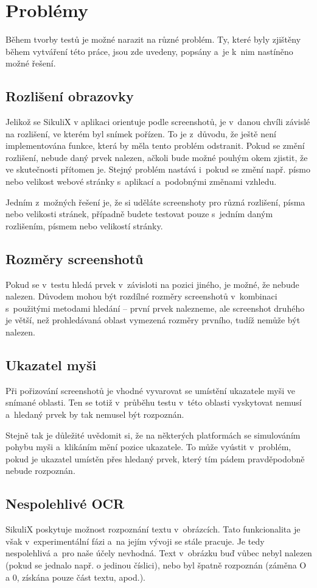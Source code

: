 \chapter{Problémy}
Během tvorby testů je možné narazit na různé problém. Ty, které byly zjištěny během vytváření této práce, jsou zde uvedeny, popsány a~je k~nim nastíněno možné řešení.

	\section{Rozlišení obrazovky}
	Jelikož se SikuliX v aplikaci orientuje podle screenshotů, je v~danou chvíli závislé na rozlišení, ve kterém byl snímek pořízen. To je z~důvodu, že ještě není implementována funkce, která by měla tento problém odstranit. Pokud se změní rozlišení, nebude daný prvek nalezen, ačkoli bude možné pouhým okem zjistit, že ve skutečnosti přítomen je. Stejný problém nastává i~pokud se změní např. písmo nebo velikost webové stránky s~aplikací a~podobnými změnami vzhledu.
	
	Jedním z~možných řešení je, že si uděláte screenshoty pro různá rozlišení, písma nebo velikosti stránek, případně budete testovat pouze s~jedním daným rozlišením, písmem nebo velikostí stránky.
	
	\section{Rozměry screenshotů}
	Pokud se v~testu hledá prvek v~závisloti na pozici jiného, je možné, že nebude nalezen. Důvodem mohou být rozdílné rozměry screenshotů v~kombinaci s~použitými metodami hledání -- první prvek nalezneme, ale screenshot druhého je větší, než prohledávaná oblast vymezená rozměry prvního, tudíž nemůže být nalezen.
	
	\section{Ukazatel myši}
	Při pořizování screenshotů je vhodné vyvarovat se umístění ukazatele myši ve snímané oblasti. Ten se totiž v~průběhu testu v~této oblasti vyskytovat nemusí a~hledaný prvek by tak nemusel být rozpoznán.
	
	Stejně tak je důležité uvědomit si, že na některých platformách se simulováním pohybu myši a~klikáním mění pozice ukazatele. To může vyústit v~problém, pokud je ukazatel umístěn přes hledaný prvek, který tím pádem pravděpodobně nebude rozpoznán.
	
	\section{Nespolehlivé OCR}
	SikuliX poskytuje možnost rozpoznání textu v~obrázcích. Tato funkcionalita je však v~experimentální fázi a~na jejím vývoji se stále pracuje. Je tedy nespolehlivá a~pro naše účely nevhodná. Text v~obrázku buď vůbec nebyl nalezen (pokud se jednalo např. o jedinou číslici), nebo byl špatně rozpoznán (záměna O a 0, získána pouze část textu, apod.).
	
